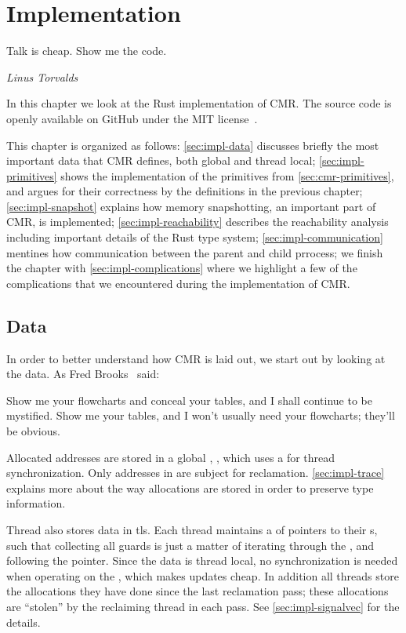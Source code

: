 \chapter{Implementation\label{ch:implementation}}

\epigraph{Talk is cheap. Show me the code.}{\textit{Linus Torvalds}}

In this chapter we look at the Rust implementation of CMR\@. The source code is openly available
on GitHub under the MIT license~\cite{cmr-github}.

This chapter is organized as follows: \cref{sec:impl-data} discusses briefly the most important
data that CMR defines, both global and thread local;
\cref{sec:impl-primitives} shows the implementation of the primitives from
\cref{sec:cmr-primitives}, and argues for their correctness by the definitions in the previous
chapter;
\cref{sec:impl-snapshot} explains how memory snapshotting, an important part of CMR, is
implemented;
\cref{sec:impl-reachability} describes the reachability analysis including important details of the
Rust type system;
\cref{sec:impl-communication} mentines how communication between the parent and child prrocess;
we finish the chapter with \cref{sec:impl-complications} where we highlight a few of the
complications that we encountered during the implementation of CMR.

\clearpage

\section{Data\label{sec:impl-data}}

In order to better understand how CMR is laid out, we start out by looking at the data.
As Fred Brooks~\cite{brooks1995mythical} said:
\begin{displayquote}
Show me your flowcharts and conceal your tables, and I shall continue to be mystified. Show me your
  tables, and I won't usually need your flowcharts; they'll be obvious.
\end{displayquote}

Allocated addresses are stored in a global , , which uses a 
for thread synchronization. Only addresses in  are subject for reclamation.
\cref{sec:impl-trace} explains more about the way allocations are stored in order to preserve type
information.

Thread also stores data in \gls{tls}. Each thread maintains a  of pointers to their
s, such that collecting all guards is just a matter of iterating through the
, and following the pointer. Since the data is thread local, no synchronization is needed
when operating on the , which makes updates cheap.
In addition all threads store the allocations they have done since the last reclamation pass;
these allocations are ``stolen'' by the reclaiming thread in each pass. See
\cref{sec:impl-signalvec} for the details.

